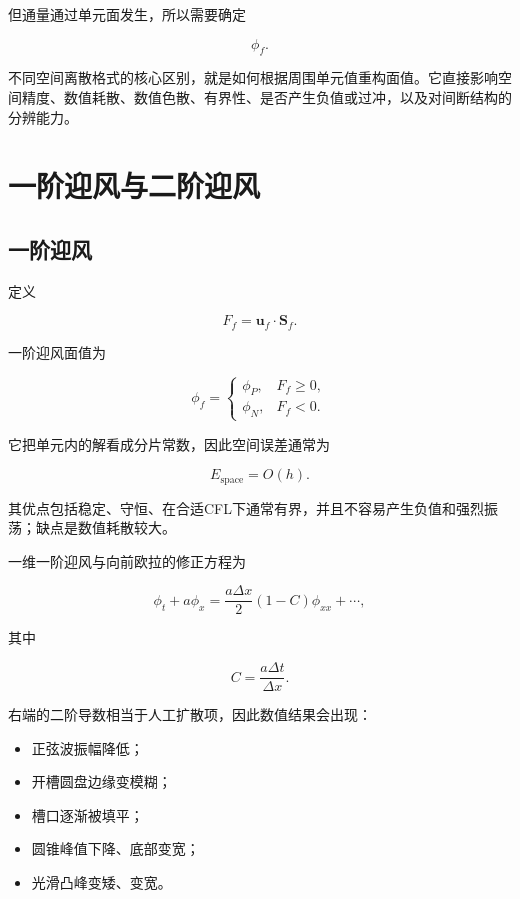 \documentclass[UTF8,12pt,a4paper,fontset=fandol]{ctexart}
\begin{document}
但通量通过单元面发生，所以需要确定

\begin{equation}
\phi_f.
\end{equation}

不同空间离散格式的核心区别，就是如何根据周围单元值重构面值。它直接影响空间精度、数值耗散、数值色散、有界性、是否产生负值或过冲，以及对间断结构的分辨能力。

\section{一阶迎风与二阶迎风}

\subsection{一阶迎风}

定义

\begin{equation}
F_f=\bm u_f\cdot\bm S_f.
\end{equation}

一阶迎风面值为

\begin{equation}
\phi_f=
\begin{cases}
\phi_P, & F_f\geq0,\\
\phi_N, & F_f<0.
\end{cases}
\end{equation}

它把单元内的解看成分片常数，因此空间误差通常为

\begin{equation}
E_{\mathrm{space}}=O(h).
\end{equation}

其优点包括稳定、守恒、在合适CFL下通常有界，并且不容易产生负值和强烈振荡；缺点是数值耗散较大。

一维一阶迎风与向前欧拉的修正方程为

\begin{equation}
\phi_t+a\phi_x
=
\frac{a\Delta x}{2}(1-C)\phi_{xx}
+\cdots,
\end{equation}

其中

\begin{equation}
C=\frac{a\Delta t}{\Delta x}.
\end{equation}

右端的二阶导数相当于人工扩散项，因此数值结果会出现：

\begin{itemize}
  \item 正弦波振幅降低；
  \item 开槽圆盘边缘变模糊；
  \item 槽口逐渐被填平；
  \item 圆锥峰值下降、底部变宽；
  \item 光滑凸峰变矮、变宽。
\end{itemize}
\end{document}
